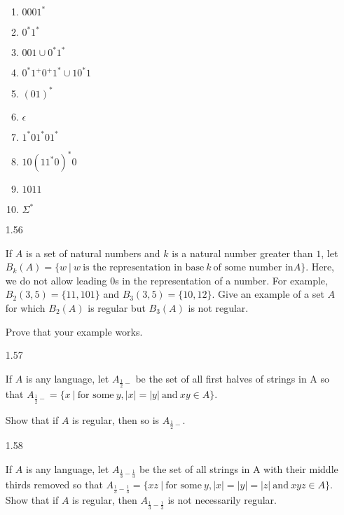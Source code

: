 \begin{enumerate}
            \begin{enumerate}
                  \item $0001^\ast$
                  \item $0^\ast 1^\ast$
                  \item $001 \cup 0^\ast 1^\ast$
                  \item $0^\ast 1^+ 0^+ 1^\ast \cup 10^\ast1$
                  \item $(01)^\ast$
                  \item $\epsilon$
                  \item $1^\ast01^\ast01^\ast$
                  \item $10(11^\ast0)^\ast0$
                  \item $1011$
                  \item $\Sigma^\ast$
            \end{enumerate}
            
      \item [1.56]
            
            If $A$ is a set of natural numbers and $k$ is a natural number greater than $1$, let $B_k(A)=\{w~|~w~ \text{is the representation in base}~k~\text{of some number in} A\}$. Here, we do not allow leading $0$s in the representation of a number. For example, $B_2({3,5})=\{11,101\}$ and $B_3({3,5})=\{10,12\}$. Give an example of a set $A$ for which $B_2(A)$ is regular but $B_3(A)$ is not regular. 
            
            Prove that your example works.
            
      \item [1.57]
            
            If $A$ is any language, let $A_{\frac{1}{2}-}$ be the set of all first halves of strings in A so that $A_{\frac{1}{2}-} = \{x~|~ \text{for some}~ y, |x| = |y| ~\text{and}~ xy \in A\}$. 
            
            Show that if $A$ is regular, then so is $A_{\frac{1}{2}-}$.
            
      \item [1.58]
            
            If $A$ is any language, let $A_{\frac{1}{3}-\frac{1}{3}}$ be the set of all strings in A with their middle thirds removed so that $A_{\frac{1}{3}-\frac{1}{3}} = \{xz~|~ \text{for some}~ y, |x| = |y| = |z|~ \text{and}~ xyz \in A\}$. Show that if $A$ is regular, then $A_{\frac{1}{3}-\frac{1}{3}}$ is not necessarily regular.
            

\end{enumerate}
